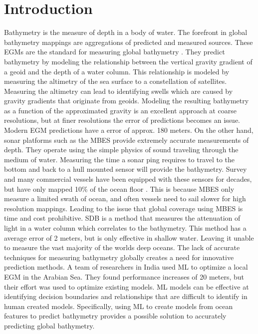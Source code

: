 
\section{Introduction}
\setlength{\parindent}{10ex}
Bathymetry is the measure of depth in a body of water.
The forefront in global bathymetry mappings are aggregations of predicted and measured sources. 
These \ac{EGM}s are the standard for measuring global bathymetry \cite{becker2009global}\cite{smith1994bathymetric}\cite{smith1997global}\cite{smith2010planning}.
They predict bathymetry by modeling the relationship between the vertical gravity gradient of a geoid and the depth of a water column.
This relationship is modeled by measuring the altimetry of the sea surface to a constellation of satellites.
Measuring the altimetry can lead to identifying swells which are caused by gravity gradients that originate from geoids.
Modeling the resulting bathymetry as a function of the approximated gravity is an excellent approach at coarse resolutions, but at finer resolutions the error of predictions becomes an issue.
Modern \ac{EGM} predictions have a error of approx. 180 meters.
On the other hand, sonar platforms such as the \ac{MBES} \cite{farr1980multibeam} provide extremely accurate measurements of depth. 
They operate using the simple physics of sound traveling through the medium of water.
Measuring the time a sonar ping requires to travel to the bottom and back to a hull mounted sensor will provide the bathymetry.
Survey and many commercial vessels have been equipped with these sensors for decades, but have only mapped 10\% of the ocean floor \cite{becker2009global}.
This is because \ac{MBES} only measure a limited swath of ocean, and often vessels need to sail slower for high resolution mappings.
Leading to the issue that global coverage using \ac{MBES} is time and cost prohibitive.
\ac{SDB} is a method that measures the attenuation of light in a water column which correlates to the bathymetry.
This method has a average error of 2 meters, but is only effective in shallow water.
Leaving it unable to measure the vast majority of the worlds deep oceans.
The lack of accurate techniques for measuring bathymetry globally creates a need for innovative prediction methods.
A team of researchers in India \cite{jena2012prediction} used \ac{ML} to optimize a local \ac{EGM} in the Arabian Sea.
They found performance increases of 20 meters, but their effort was used to optimize existing models.
\ac{ML} models can be effective at identifying decision boundaries and relationships that are difficult to identify in human created models.
Specifically, using \ac{ML} to create models from ocean features to predict bathymetry provides a possible solution to accurately predicting global bathymetry.

